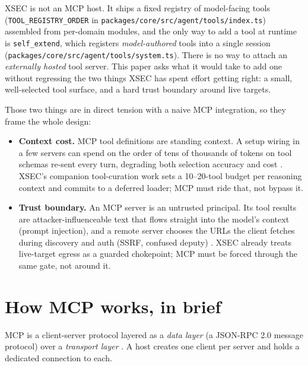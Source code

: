 \documentclass[11pt]{article}
\begin{document}
XSEC is not an MCP host. It ships a fixed registry of model-facing tools
(\texttt{TOOL\_REGISTRY\_ORDER} in
\texttt{packages/core/src/agent/tools/index.ts}) assembled from per-domain
modules, and the only way to add a tool at runtime is \texttt{self\_extend},
which registers \emph{model-authored} tools into a single session
(\texttt{packages/core/src/agent/tools/system.ts}). There is no way to attach an
\emph{externally hosted} tool server. This paper asks what it would take to add
one without regressing the two things XSEC has spent effort getting right: a
small, well-selected tool surface, and a hard trust boundary around live
targets.

Those two things are in direct tension with a naive MCP integration, so they
frame the whole design:

\begin{itemize}[leftmargin=*]
  \item \textbf{Context cost.} MCP tool definitions are standing context. A
  setup wiring in a few servers can spend on the order of tens of thousands of
  tokens on tool schemas re-sent every turn, degrading both selection accuracy
  and cost \cite{mcp-clientbp,anthropic-toolsearch}. XSEC's companion
  tool-curation work \cite{tool-curation} sets a 10--20-tool budget per
  reasoning context and commits to a deferred loader; MCP must ride that, not
  bypass it.
  \item \textbf{Trust boundary.} An MCP server is an untrusted principal. Its
  tool results are attacker-influenceable text that flows straight into the
  model's context (prompt injection), and a remote server chooses the URLs the
  client fetches during discovery and auth (SSRF, confused deputy)
  \cite{mcp-security}. XSEC already treats live-target egress as a guarded
  chokepoint; MCP must be forced through the same gate, not around it.
\end{itemize}

\section{How MCP works, in brief}

MCP is a client-server protocol layered as a \emph{data layer} (a JSON-RPC 2.0
message protocol) over a \emph{transport layer} \cite{mcp-arch}. A host creates
one client per server and holds a dedicated connection to each.
\end{document}
